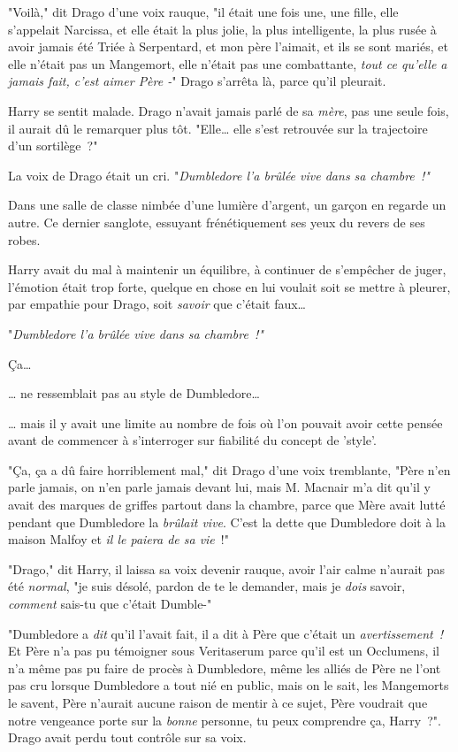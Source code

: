 "Voilà," dit Drago d'une voix rauque, "il était une fois une, une fille, elle s'appelait Narcissa, et elle était la plus jolie, la plus intelligente, la plus rusée à avoir jamais été Triée à Serpentard, et mon père l'aimait, et ils se sont mariés, et elle n'était pas un Mangemort, elle n'était pas une combattante, \emph{tout ce qu'elle a jamais fait, c'est aimer Père -}" Drago s'arrêta là, parce qu'il pleurait.

Harry se sentit malade. Drago n'avait jamais parlé de sa \emph{mère}, pas une seule fois, il aurait dû le remarquer plus tôt. "Elle… elle s'est retrouvée sur la trajectoire d'un sortilège~?"

La voix de Drago était un cri. "\emph{Dumbledore l'a brûlée vive dans sa chambre~!"}

\later

Dans une salle de classe nimbée d'une lumière d'argent, un garçon en regarde un autre. Ce dernier sanglote, essuyant frénétiquement ses yeux du revers de ses robes.

Harry avait du mal à maintenir un équilibre, à continuer de s'empêcher de juger, l'émotion était trop forte, quelque en chose en lui voulait soit se mettre à pleurer, par empathie pour Drago, soit \emph{savoir} que c'était faux…

"\emph{Dumbledore l'a brûlée vive dans sa chambre~!"}

Ça…

… ne ressemblait pas au style de Dumbledore…

… mais il y avait une limite au nombre de fois où l'on pouvait avoir cette pensée avant de commencer à s'interroger sur fiabilité du concept de 'style'.

"Ça, ça a dû faire horriblement mal," dit Drago d'une voix tremblante, "Père n'en parle jamais, on n'en parle jamais devant lui, mais M. Macnair m'a dit qu'il y avait des marques de griffes partout dans la chambre, parce que Mère avait lutté pendant que Dumbledore la \emph{brûlait vive}. C'est la dette que Dumbledore doit à la maison Malfoy et \emph{il le paiera de sa vie}~!"

"Drago," dit Harry, il laissa sa voix devenir rauque, avoir l'air calme n'aurait pas été \emph{normal}, "je suis désolé, pardon de te le demander, mais je \emph{dois} savoir, \emph{comment} sais-tu que c'était Dumble-"

"Dumbledore a \emph{dit} qu'il l'avait fait, il a dit à Père que c'était un \emph{avertissement~!} Et Père n'a pas pu témoigner sous Veritaserum parce qu'il est un Occlumens, il n'a même pas pu faire de procès à Dumbledore, même les alliés de Père ne l'ont pas cru lorsque Dumbledore a tout nié en public, mais on le sait, les Mangemorts le savent, Père n'aurait aucune raison de mentir à ce sujet, Père voudrait que notre vengeance porte sur la \emph{bonne} personne, tu peux comprendre ça, Harry~?". Drago avait perdu tout contrôle sur sa voix.

